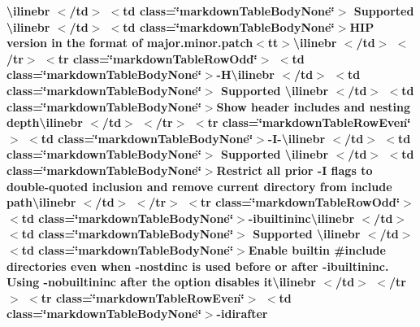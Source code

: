 \begin{longtabu}
{\bfseries{{\ttfamily \textbackslash{}ilinebr \texorpdfstring{$<$}{<}/td\texorpdfstring{$>$}{>} \texorpdfstring{$<$}{<}td class=\char`\"{}markdown\+Table\+Body\+None\char`\"{}\texorpdfstring{$>$}{>} Supported \textbackslash{}ilinebr \texorpdfstring{$<$}{<}/td\texorpdfstring{$>$}{>} \texorpdfstring{$<$}{<}td class=\char`\"{}markdown\+Table\+Body\+None\char`\"{}\texorpdfstring{$>$}{>}}HIP version in the format of major.\+minor.\+patch$<$tt$>$\textbackslash{}ilinebr \texorpdfstring{$<$}{<}/td\texorpdfstring{$>$}{>} \texorpdfstring{$<$}{<}/tr\texorpdfstring{$>$}{>} \texorpdfstring{$<$}{<}tr class=\char`\"{}markdown\+Table\+Row\+Odd\char`\"{}\texorpdfstring{$>$}{>} \texorpdfstring{$<$}{<}td class=\char`\"{}markdown\+Table\+Body\+None\char`\"{}\texorpdfstring{$>$}{>}-\/H{\ttfamily \textbackslash{}ilinebr \texorpdfstring{$<$}{<}/td\texorpdfstring{$>$}{>} \texorpdfstring{$<$}{<}td class=\char`\"{}markdown\+Table\+Body\+None\char`\"{}\texorpdfstring{$>$}{>} Supported \textbackslash{}ilinebr \texorpdfstring{$<$}{<}/td\texorpdfstring{$>$}{>} \texorpdfstring{$<$}{<}td class=\char`\"{}markdown\+Table\+Body\+None\char`\"{}\texorpdfstring{$>$}{>}}Show header includes and nesting depth{\ttfamily \textbackslash{}ilinebr \texorpdfstring{$<$}{<}/td\texorpdfstring{$>$}{>} \texorpdfstring{$<$}{<}/tr\texorpdfstring{$>$}{>} \texorpdfstring{$<$}{<}tr class=\char`\"{}markdown\+Table\+Row\+Even\char`\"{}\texorpdfstring{$>$}{>} \texorpdfstring{$<$}{<}td class=\char`\"{}markdown\+Table\+Body\+None\char`\"{}\texorpdfstring{$>$}{>}}-\/I-\/{\ttfamily \textbackslash{}ilinebr \texorpdfstring{$<$}{<}/td\texorpdfstring{$>$}{>} \texorpdfstring{$<$}{<}td class=\char`\"{}markdown\+Table\+Body\+None\char`\"{}\texorpdfstring{$>$}{>} Supported \textbackslash{}ilinebr \texorpdfstring{$<$}{<}/td\texorpdfstring{$>$}{>} \texorpdfstring{$<$}{<}td class=\char`\"{}markdown\+Table\+Body\+None\char`\"{}\texorpdfstring{$>$}{>}}Restrict all prior -\/I flags to double-\/quoted inclusion and remove current directory from include path{\ttfamily \textbackslash{}ilinebr \texorpdfstring{$<$}{<}/td\texorpdfstring{$>$}{>} \texorpdfstring{$<$}{<}/tr\texorpdfstring{$>$}{>} \texorpdfstring{$<$}{<}tr class=\char`\"{}markdown\+Table\+Row\+Odd\char`\"{}\texorpdfstring{$>$}{>} \texorpdfstring{$<$}{<}td class=\char`\"{}markdown\+Table\+Body\+None\char`\"{}\texorpdfstring{$>$}{>}}-\/ibuiltininc{\ttfamily \textbackslash{}ilinebr \texorpdfstring{$<$}{<}/td\texorpdfstring{$>$}{>} \texorpdfstring{$<$}{<}td class=\char`\"{}markdown\+Table\+Body\+None\char`\"{}\texorpdfstring{$>$}{>} Supported \textbackslash{}ilinebr \texorpdfstring{$<$}{<}/td\texorpdfstring{$>$}{>} \texorpdfstring{$<$}{<}td class=\char`\"{}markdown\+Table\+Body\+None\char`\"{}\texorpdfstring{$>$}{>}}Enable builtin \#include directories even when -\/nostdinc is used before or after -\/ibuiltininc. Using -\/nobuiltininc after the option disables it{\ttfamily \textbackslash{}ilinebr \texorpdfstring{$<$}{<}/td\texorpdfstring{$>$}{>} \texorpdfstring{$<$}{<}/tr\texorpdfstring{$>$}{>} \texorpdfstring{$<$}{<}tr class=\char`\"{}markdown\+Table\+Row\+Even\char`\"{}\texorpdfstring{$>$}{>} \texorpdfstring{$<$}{<}td class=\char`\"{}markdown\+Table\+Body\+None\char`\"{}\texorpdfstring{$>$}{>}}-\/idirafter }}


\end{longtabu}
